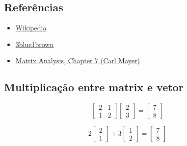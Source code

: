\documentclass[
  letterpaper,
  DIV=11,
  numbers=noendperiod]{scrartcl}
\providecommand{\tightlist}{%
  \setlength{\itemsep}{0pt}\setlength{\parskip}{0pt}}\usepackage{longtable,booktabs,array}
\begin{document}
\hypertarget{referuxeancias}{%
\subsection{Referências}\label{referuxeancias}}

\begin{itemize}
\tightlist
\item
  \href{https://en.wikipedia.org/wiki/Eigendecomposition_of_a_matrix}{Wikipedia}
\item
  \href{https://youtu.be/PFDu9oVAE-g}{3blue1brown}
\item
  \href{http://www.ime.unicamp.br/~andreani/matrizes/capitulo7.pdf}{Matrix
  Analysis, Chapter 7 (Carl Mayer)}
\end{itemize}

\hypertarget{multiplicauxe7uxe3o-entre-matrix-e-vetor}{%
\subsection{Multiplicação entre matrix e
vetor}\label{multiplicauxe7uxe3o-entre-matrix-e-vetor}}

\[ \begin{bmatrix}2 & 1\\ 1 & 2\end{bmatrix}\begin{bmatrix}2\\3\end{bmatrix}=\begin{bmatrix}7\\8\end{bmatrix}\]

\[ 2\begin{bmatrix}2 \\ 1\end{bmatrix} + 3\begin{bmatrix}1 \\ 2\end{bmatrix}=\begin{bmatrix}7\\8\end{bmatrix}\]
\end{document}
